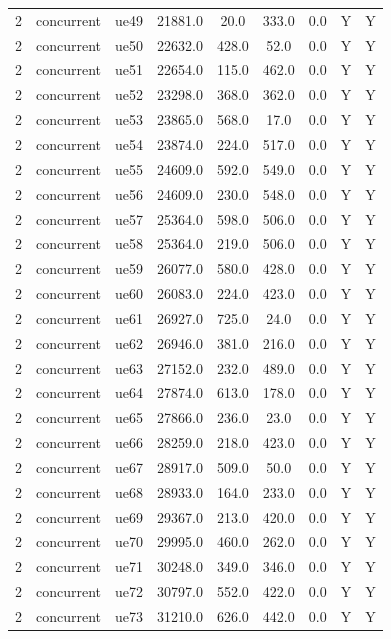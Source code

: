 \begin{table}[ht]
\begin{tabular}{|c|c|c|c|c|c|c|c|c|}
2 & concurrent & ue49 & 21881.0 & 20.0 & 333.0 & 0.0 & Y & Y \\
2 & concurrent & ue50 & 22632.0 & 428.0 & 52.0 & 0.0 & Y & Y \\
2 & concurrent & ue51 & 22654.0 & 115.0 & 462.0 & 0.0 & Y & Y \\
2 & concurrent & ue52 & 23298.0 & 368.0 & 362.0 & 0.0 & Y & Y \\
2 & concurrent & ue53 & 23865.0 & 568.0 & 17.0 & 0.0 & Y & Y \\
2 & concurrent & ue54 & 23874.0 & 224.0 & 517.0 & 0.0 & Y & Y \\
2 & concurrent & ue55 & 24609.0 & 592.0 & 549.0 & 0.0 & Y & Y \\
2 & concurrent & ue56 & 24609.0 & 230.0 & 548.0 & 0.0 & Y & Y \\
2 & concurrent & ue57 & 25364.0 & 598.0 & 506.0 & 0.0 & Y & Y \\
2 & concurrent & ue58 & 25364.0 & 219.0 & 506.0 & 0.0 & Y & Y \\
2 & concurrent & ue59 & 26077.0 & 580.0 & 428.0 & 0.0 & Y & Y \\
2 & concurrent & ue60 & 26083.0 & 224.0 & 423.0 & 0.0 & Y & Y \\
2 & concurrent & ue61 & 26927.0 & 725.0 & 24.0 & 0.0 & Y & Y \\
2 & concurrent & ue62 & 26946.0 & 381.0 & 216.0 & 0.0 & Y & Y \\
2 & concurrent & ue63 & 27152.0 & 232.0 & 489.0 & 0.0 & Y & Y \\
2 & concurrent & ue64 & 27874.0 & 613.0 & 178.0 & 0.0 & Y & Y \\
2 & concurrent & ue65 & 27866.0 & 236.0 & 23.0 & 0.0 & Y & Y \\
2 & concurrent & ue66 & 28259.0 & 218.0 & 423.0 & 0.0 & Y & Y \\
2 & concurrent & ue67 & 28917.0 & 509.0 & 50.0 & 0.0 & Y & Y \\
2 & concurrent & ue68 & 28933.0 & 164.0 & 233.0 & 0.0 & Y & Y \\
2 & concurrent & ue69 & 29367.0 & 213.0 & 420.0 & 0.0 & Y & Y \\
2 & concurrent & ue70 & 29995.0 & 460.0 & 262.0 & 0.0 & Y & Y \\
2 & concurrent & ue71 & 30248.0 & 349.0 & 346.0 & 0.0 & Y & Y \\
2 & concurrent & ue72 & 30797.0 & 552.0 & 422.0 & 0.0 & Y & Y \\
2 & concurrent & ue73 & 31210.0 & 626.0 & 442.0 & 0.0 & Y & Y \\

\end{tabular}
\end{table}
